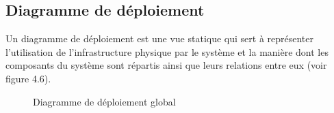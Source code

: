 \subsection{\selectfont\Large Diagramme de déploiement}
 Un diagramme de déploiement est une vue statique qui sert à représenter l'utilisation de l'infrastructure physique par le système et la manière dont les composants du système sont répartis ainsi que leurs relations entre eux (voir figure 4.6)\cite{15}.
\begin{figure}[H]
  \begin{center}
  

  \end{center}
  
  \caption{Diagramme de déploiement global}
\end{figure}
